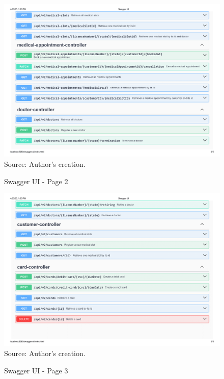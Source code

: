 	\begin{landscape}
		 \begin{figure}[H]
			\centering
			\caption{Swagger UI - Page 2}
			\includegraphics[width=0.83\linewidth]{figures/swagger_ui_2.png}
			\label{fig:swagger_ui_2}
			\\ \footnotesize Source: Author's creation.
		\end{figure}
	\end{landscape}

	\begin{landscape}
	    \begin{figure}[H]
			\centering
			\caption{Swagger UI - Page 3}
			\includegraphics[width=0.83\linewidth]{figures/swagger_ui_3.png}
			\label{fig:swagger_ui_3}
			\\ \footnotesize Source: Author's creation.
		\end{figure}
	\end{landscape}

